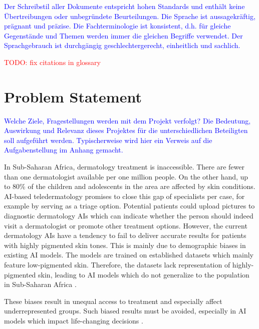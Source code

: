 \documentclass[12pt, a4paper, oneside]{book}   	%
\renewcommand{\todo}[1]{\textcolor{red}{TODO: #1}}
\newcommand{\baaCriteria}[1]{\textcolor{blue}{#1}}
\begin{document}
	
	\baaCriteria{Der Schreibstil aller Dokumente entspricht hohen Standards und enthält keine Übertreibungen oder unbegründete Beurteilungen. Die Sprache ist aussagekräftig, prägnant und präzise. Die Fachterminologie ist konsistent, d.h. für gleiche Gegenstände und Themen werden immer die gleichen Begriffe verwendet. Der Sprachgebrauch ist durchgängig geschlechtergerecht, einheitlich und sachlich.}
	
	\listoffigures
	\listoftables
	\printnoidxglossaries
	
	\todo{fix citations in glossary}
	
	\mainmatter
	
	
	\chapter{Problem Statement}
		\baaCriteria{Welche Ziele, Fragestellungen werden mit dem Projekt verfolgt? Die Bedeutung, Auswirkung und Relevanz dieses Projektes für die unterschiedlichen Beteiligten soll aufgeführt werden. Typischerweise wird hier ein Verweis auf die Aufgabenstellung im Anhang gemacht.}
		
		In Sub-Saharan Africa, dermatology treatment is inaccessible. There are fewer than one dermatologist available per one million people. On the other hand, up to 80\% of the children and adolescents in the area are affected by skin conditions. AI-based \gls{teledermatology} promises to close this gap of specialists per case, for example by serving as a triage option. Potential patients could upload pictures to diagnostic dermatology AIs which can indicate whether the person should indeed visit a dermatologist or promote other treatment options. However, the current dermatology AIs have a tendency to fail to deliver accurate results for patients with highly pigmented skin tones. This is mainly due to demographic biases in existing AI models. The models are trained on established datasets which mainly feature low-pigmented skin. Therefore, the datasets lack representation of highly-pigmented skin, leading to AI models which do not generalize to the population in Sub-Saharan Africa  \autocite{Gottfrois2024}.
		
		These biases result in unequal access to treatment and especially affect underrepresented groups. Such biased results must be avoided, especially in AI models which impact life-changing decisions \autocite{Mehrabi_2021}.
		
\end{document}
